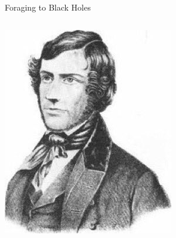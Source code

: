 \documentclass{beamer}
\begin{document}
\begin{frame}{Foraging to Black Holes}
    \begin{columns}
        \centering
        \includegraphics[width=\textwidth]{asset/michell.jpg}
        \centering

\end{columns}
\end{frame}
\end{document}
